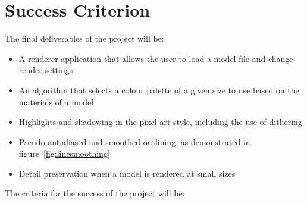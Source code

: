 \documentclass[12pt,twoside,notitlepage]{report}
\begin{document}
\section*{Success Criterion}

The final deliverables of the project will be:

\begin{itemize}

\item A renderer application that allows the user to load a model file and change render settings

\item An algorithm that selects a colour palette of a given size to use based on the materials of a model

\item Highlights and shadowing in the pixel art style, including the use of dithering

\item Pseudo-antialiased and smoothed outlining, as demonstrated in figure~\ref{fig:linesmoothing}

\item Detail preservation when a model is rendered at small sizes

\end{itemize}

The criteria for the success of the project will be:
\end{document}
